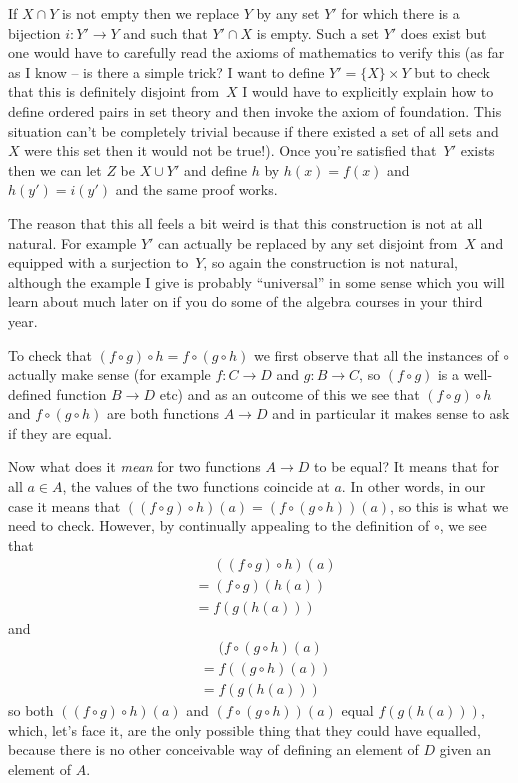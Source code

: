 \documentclass[10pt]{article}
\begin{document}
If $X\cap Y$ is not empty then we replace $Y$ by any set $Y'$ for which there is a bijection $i:Y'\to Y$ and such that $Y'\cap X$ is empty. Such a set $Y'$ does exist but one would have to carefully read the axioms of mathematics to verify this (as far as I know -- is there a simple trick? I want to define $Y'=\{X\}\times Y$ but to check that this is definitely disjoint from~$X$ I would have to explicitly explain how to define ordered pairs in set theory and then invoke the axiom of foundation. This situation can't be completely trivial because if there existed a set of all sets and $X$ were this set then it would not be true!). Once you're satisfied that~$Y'$ exists then we can let $Z$ be $X\cup Y'$ and define $h$ by $h(x)=f(x)$ and $h(y')=i(y')$ and the same proof works.

The reason that this all feels a bit weird is that this construction is not at all natural. For example $Y'$ can actually be replaced by any set disjoint from~$X$ and equipped with a surjection to~$Y$, so again the construction is not natural, although the example I give is probably ``universal'' in some sense which you will learn about much later on if you do some of the algebra courses in your third year.

\medskip{} To check that $(f\circ g)\circ h=f\circ(g\circ h)$ we first observe that all the instances of $\circ$ actually make sense (for example $f:C\to D$ and $g:B\to C$, so $(f\circ g)$ is a well-defined function $B\to D$ etc) and as an outcome of this we see that $(f\circ g)\circ h$ and $f\circ (g\circ h)$ are both functions $A\to D$ and in particular it makes sense to ask if they are equal.

Now what does it \emph{mean} for two functions $A\to D$ to be equal? It means that for all $a\in A$, the values of the two functions coincide at $a$. In other words, in our case it means that $((f\circ g)\circ h)(a)=(f\circ(g\circ h))(a)$, so this is what we need to check. However, by continually appealing to the definition of $\circ$, we see that
\begin{align*}
&\phantom{=}((f\circ g)\circ h)(a)\\
&=(f\circ g)(h(a))\\
&=f(g(h(a)))
\end{align*}
and
\begin{align*}
&\phantom{=}(f\circ (g\circ h)(a)\\
&=f((g\circ h)(a))\\
&=f(g(h(a)))
\end{align*}
so both $((f\circ g)\circ h)(a)$ and $(f\circ(g\circ h))(a)$ equal $f(g(h(a)))$, which, let's face it, are the only possible thing that they could have equalled, because there is no other conceivable way of defining an element of $D$ given an element of $A$.
\end{document}
